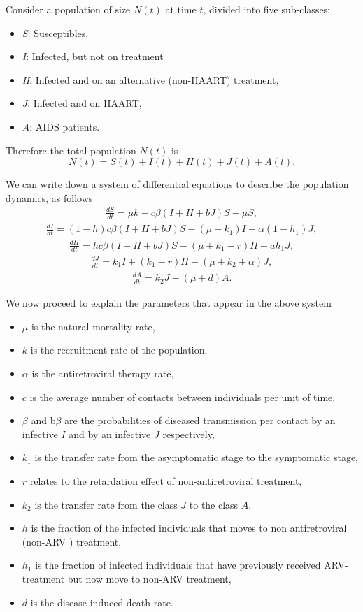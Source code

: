 Consider a population of size $N(t)$ at time $t$, divided into five sub-classes:
\begin{itemize}
\item \textit{S}: Susceptibles,
\item \textit{I}: Infected, but not on treatment
\item \textit{H}: Infected and on an alternative (non-HAART) treatment,
\item \textit{J}: Infected and on HAART,
\item \textit{A}: AIDS patients.
\end{itemize}

Therefore the total population $N(t)$ is
$$
N(t) = S(t) + I(t) + H(t) + J(t) + A(t).
$$

We can write down a system of differential equations to describe the population dynamics, as follows
\begin{align}
\frac{dS}{dt} = \mu k - c\beta(I+H+bJ)S - \mu S,
\end{align}
\begin{align}
\frac{dI}{dt} = (1-h)c\beta(I+H+bJ)S - (\mu+k_{1})I + \alpha(1-h_{1})J,
\end{align}
\begin{align}
\frac{dH}{dt} = hc\beta(I+H+bJ)S - (\mu+k_{1}-r)H + ah_{1}J,
\end{align}
\begin{align}
\frac{dJ}{dt} = k_{1}I + (k_{1}-r)H - (\mu+k_{2}+\alpha)J,
\end{align}
\begin{align}
\frac{dA}{dt} = k_{2}J - (\mu+d)A.
\end{align}

We now proceed to explain the parameters that appear in the above system
\begin{itemize}
\item $\mu$ is the natural mortality rate,
\item $k$ is the recruitment rate of the population,
\item $\alpha$ is the antiretroviral therapy rate,
\item $c$ is the average number of contacts between individuals per unit of time,
\item $\beta$ and b$\beta$ are the probabilities of diseased transmission per contact by an infective $I$ and by an infective $J$ respectively,
\item $k_{1}$ is the transfer rate from the asymptomatic stage to the symptomatic stage,
\item $r$ relates to the retardation effect of non-antiretroviral treatment,
\item $k_{2}$ is the transfer rate from the class $J$ to the class $A$,
\item $h$ is the fraction of the infected individuals that moves to non antiretroviral (non-ARV ) treatment,
\item $h_{1}$ is the fraction of infected individuals that have previously received ARV-treatment but now move to non-ARV treatment,
\item $d$ is the disease-induced death rate.
\end{itemize}

